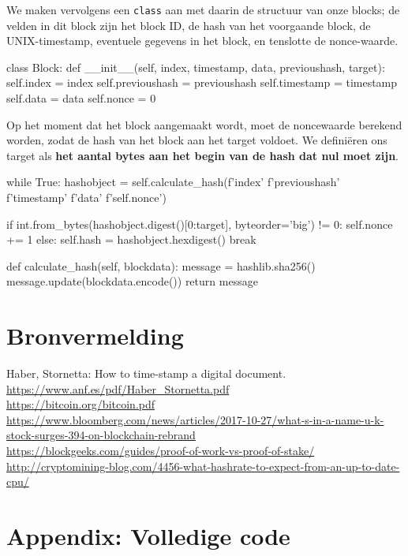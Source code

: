\documentclass{article}
\begin{document}
We maken vervolgens een \texttt{class} aan met daarin de structuur van onze blocks; de velden in dit block zijn het block ID, de hash van het voorgaande block, de UNIX-timestamp, eventuele gegevens in het block, en tenslotte de nonce-waarde.
\begin{python3code}
class Block:
    def __init__(self, index, timestamp, data, previoushash, target):
        self.index = index
        self.previoushash = previoushash
        self.timestamp = timestamp
        self.data = data
        self.nonce = 0
        
\end{python3code}

Op het moment dat het block aangemaakt wordt, moet de noncewaarde berekend worden, zodat de hash van het block aan het target voldoet. We definiëren ons target als \textbf{het aantal bytes aan het begin van de hash dat nul moet zijn}. 

\begin{python3code}
        while True:
            hashobject = self.calculate_hash(f'{index}'
                                             f'{previoushash}'
                                             f'{timestamp}'
                                             f'{data}'
                                             f'{self.nonce}')

            if int.from_bytes(hashobject.digest()[0:target], byteorder='big') != 0:
                self.nonce += 1
            else:
                self.hash = hashobject.hexdigest()
                break

    def calculate_hash(self, blockdata):
        message = hashlib.sha256()
        message.update(blockdata.encode())
        return message


\end{python3code}

\section{Bronvermelding}

Haber, Stornetta: How to time-stamp a digital document. \url{https://www.anf.es/pdf/Haber_Stornetta.pdf} \\
\url{https://bitcoin.org/bitcoin.pdf} \\
\url{https://www.bloomberg.com/news/articles/2017-10-27/what-s-in-a-name-u-k-stock-surges-394-on-blockchain-rebrand}
\\ \url{https://blockgeeks.com/guides/proof-of-work-vs-proof-of-stake/}
\\ \url{http://cryptomining-blog.com/4456-what-hashrate-to-expect-from-an-up-to-date-cpu/}


\newpage
\section{Appendix: Volledige code}
\end{document}
